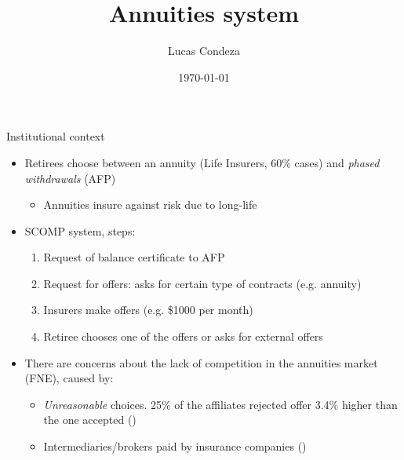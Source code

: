 \documentclass[10pt,aspectratio=169]{beamer}
\title{Annuities system}
\author{%
 Lucas Condeza
\inst{1} \and
}
\institute{
  \inst{1} Yale University \\
}
\date{\today}
\begin{document}
\begin{frame}
  \titlepage
\end{frame}






 

 



\begin{frame}{Institutional context} 
    \begin{itemize}%
        \item Retirees choose between an annuity (Life Insurers, 60\% cases)   and \textit{phased withdrawals} (AFP)
        \begin{itemize}
            \item Annuities insure against risk due to long-life 
        \end{itemize}

    \item SCOMP system, steps: %
    \begin{enumerate}
        \item Request of balance certificate to AFP %
        \item Request for offers: asks for certain type of contracts (e.g. annuity)
        \item Insurers make offers (e.g. \$1000 per month)
        \item Retiree chooses one of the offers or asks for external offers
    \end{enumerate}
        
    \item There are concerns about the lack of competition in the annuities market (FNE), caused by: 
        \begin{itemize}
            \item \textit{Unreasonable} choices. 25\% of the affiliates rejected offer 3.4\% higher than the one accepted (\cite{quiroz_estudio_2018})
            \item Intermediaries/brokers paid by insurance companies (\textcite{boehm_intermediation_nodate})
            
        \end{itemize}


\end{itemize} 
\end{frame}
\end{document}
